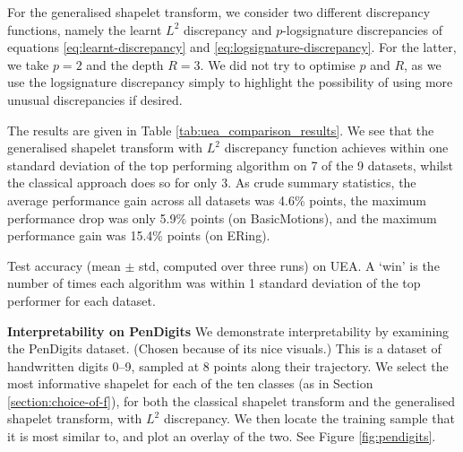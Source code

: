 \documentclass{article}
\theoremstyle{plain}
\theoremstyle{definition}
\newcommand{\boldheading}[1]{

\textbf{#1}\quad}
\begin{document}
For the generalised shapelet transform, we consider two different discrepancy functions, namely the learnt $L^2$ discrepancy and $p$-logsignature discrepancies of equations \eqref{eq:learnt-discrepancy} and \eqref{eq:logsignature-discrepancy}. For the latter, we take $p=2$ and the depth $R=3$. We did not try to optimise $p$ and $R$, as we use the logsignature discrepancy simply to highlight the possibility of using more unusual discrepancies if desired.

The results are given in Table \ref{tab:uea_comparison_results}. We see that the generalised shapelet transform with $L^2$ discrepancy function achieves within one standard deviation of the top performing algorithm on 7 of the 9 datasets, whilst the classical approach does so for only 3. As crude summary statistics, the average performance gain across all datasets was 4.6\% points, the maximum performance drop was only 5.9\% points (on BasicMotions), and the maximum performance gain was 15.4\% points (on ERing).
\begin{table}[t]
    \centering
    \caption{Test accuracy (mean $\pm$ std, computed over three runs) on UEA. A `win' is the number of times each algorithm was within 1 standard deviation of the top performer for each dataset.}
    \label{tab:uea_comparison_results}
    
\end{table}

\boldheading{Interpretability on PenDigits}
We demonstrate interpretability by examining the PenDigits dataset. (Chosen because of its nice visuals.) This is a dataset of handwritten digits 0--9, sampled at 8 points along their trajectory. We select the most informative shapelet for each of the ten classes (as in Section \ref{section:choice-of-f}), for both the classical shapelet transform and the generalised shapelet transform, with $L^2$ discrepancy. We then locate the training sample that it is most similar to, and plot an overlay of the two. See Figure \ref{fig:pendigits}.
\end{document}

